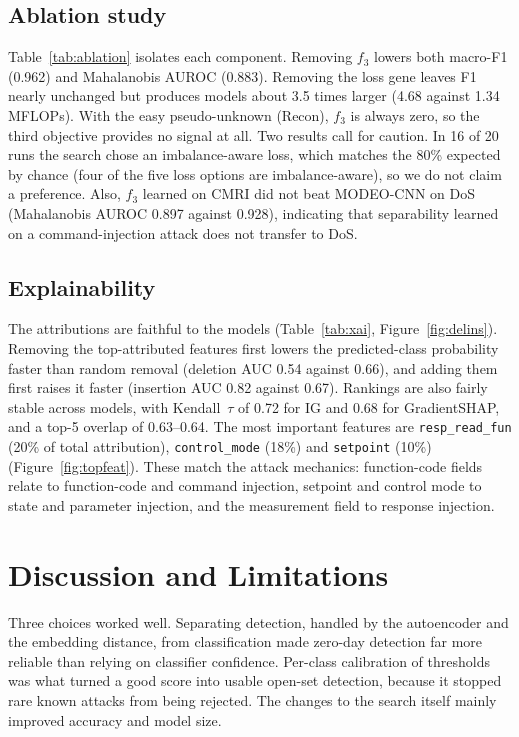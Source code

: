 \documentclass[10pt,twocolumn,letterpaper]{article}
\begin{document}
\subsection{Ablation study}
Table~\ref{tab:ablation} isolates each component. Removing $f_3$ lowers
both macro-F1 (0.962) and Mahalanobis AUROC (0.883). Removing the loss
gene leaves F1 nearly unchanged but produces models about 3.5 times
larger (4.68 against 1.34 MFLOPs). With the easy pseudo-unknown (Recon),
$f_3$ is always zero, so the third objective provides no signal at all.
Two results call for caution. In 16 of 20 runs the search chose an
imbalance-aware loss, which matches the 80\% expected by chance (four of
the five loss options are imbalance-aware), so we do not claim a
preference. Also, $f_3$ learned on CMRI did not beat MODEO-CNN on DoS
(Mahalanobis AUROC 0.897 against 0.928), indicating that separability
learned on a command-injection attack does not transfer to DoS.





\subsection{Explainability}
The attributions are faithful to the models (Table~\ref{tab:xai},
Figure~\ref{fig:delins}). Removing the top-attributed features first
lowers the predicted-class probability faster than random removal
(deletion AUC 0.54 against 0.66), and adding them first raises it faster
(insertion AUC 0.82 against 0.67). Rankings are also fairly stable across
models, with Kendall~$\tau$ of 0.72 for IG and 0.68 for GradientSHAP, and
a top-5 overlap of 0.63--0.64. The most important features are
\texttt{resp\_read\_fun} (20\% of total attribution), \texttt{control\_mode}
(18\%) and \texttt{setpoint} (10\%) (Figure~\ref{fig:topfeat}). These
match the attack mechanics: function-code fields relate to function-code
and command injection, setpoint and control mode to state and parameter
injection, and the measurement field to response injection.


\section{Discussion and Limitations}\label{sec:discussion}

Three choices worked well. Separating detection, handled by the
autoencoder and the embedding distance, from classification made zero-day
detection far more reliable than relying on classifier confidence.
Per-class calibration of thresholds was what turned a good score into
usable open-set detection, because it stopped rare known attacks from
being rejected. The changes to the search itself mainly improved accuracy
and model size.
\end{document}
